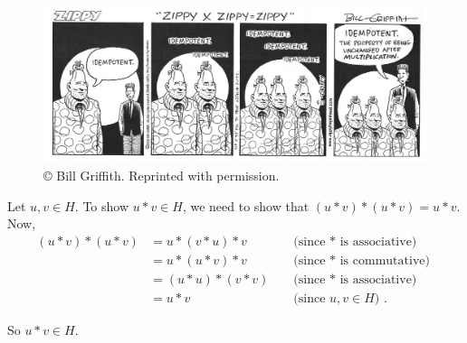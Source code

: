 \documentclass[10pt,]{book}
\theoremstyle{plain}
\theoremstyle{definition}
\theoremstyle{definition}
\theoremstyle{definition}
\theoremstyle{definition}
\numberwithin{equation}{section}
\newcommand{\amp}{ & }
\begin{document}
\leavevmode%
\begin{figure}
\centering
\includegraphics[width=1\linewidth]{zippy.png}
\caption{©  Bill Griffith. Reprinted with permission.\label{zip}}
\end{figure}
\par\smallskip

      Let \(u,v\in H\). To show \(u*v\in H\), we need to show that \((u*v)*(u*v)=u*v\). Now,
\begin{align*}
(u*v)*(u*v)\amp =u*(v*u)*v \amp \amp \text{ (since \(*\) is associative) }\\
\amp =u*(u*v)*v \amp \amp \text{ (since \(*\) is commutative) }\\
\amp =(u*u)*(v*v) \amp \amp \text{ (since \(*\) is associative) }\\
\amp =u*v \amp \amp \text{ (since \(u,v\in H\)) } .
\end{align*}

\par

      So \(u*v\in H\).
\par\smallskip
\end{document}
